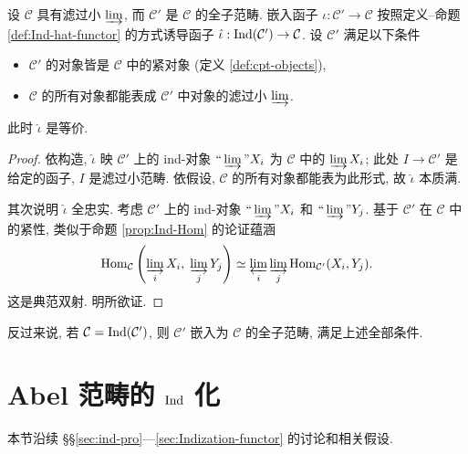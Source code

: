 \begin{proposition}[识别 $\IndC$ 化]\label{prop:recognition-Ind}
	设 $\mathcal{C}$ 具有滤过小 $\varinjlim$, 而 $\mathcal{C}'$ 是 $\mathcal{C}$ 的全子范畴. 嵌入函子 $\iota: \mathcal{C}' \to \mathcal{C}$ 按照定义--命题 \ref{def:Ind-hat-functor} 的方式诱导函子 $\hat{\iota}: \operatorname{Ind}(\mathcal{C}') \to \mathcal{C}$. 设 $\mathcal{C}'$ 满足以下条件
	\begin{itemize}
		\item $\mathcal{C}'$ 的对象皆是 $\mathcal{C}$ 中的紧对象 (定义 \ref{def:cpt-objects}),
		\item $\mathcal{C}$ 的所有对象都能表成 $\mathcal{C}'$ 中对象的滤过小 $\varinjlim$.
	\end{itemize}
	此时 $\hat{\iota}$ 是等价.
\end{proposition}
\begin{proof}
	依构造, $\hat{\iota}$ 映 $\mathcal{C}'$ 上的 ind-对象 $\Yinjlim X_i$ 为 $\mathcal{C}$ 中的 $\varinjlim X_i$; 此处 $I \to \mathcal{C}'$ 是给定的函子, $I$ 是滤过小范畴. 依假设, $\mathcal{C}$ 的所有对象都能表为此形式, 故 $\hat{\iota}$ 本质满.
	
	其次说明 $\hat{\iota}$ 全忠实. 考虑 $\mathcal{C}'$ 上的 ind-对象 $\Yinjlim X_i$ 和 $\Yinjlim Y_j$. 基于 $\mathcal{C}'$ 在 $\mathcal{C}$ 中的紧性, 类似于命题 \ref{prop:Ind-Hom} 的论证蕴涵
	\begin{gather*}
		\operatorname{Hom}_{\mathcal{C}}\left( \varinjlim_i X_i, \; \varinjlim_j Y_j\right) \simeq \varprojlim_i \varinjlim_j \operatorname{Hom}_{\mathcal{C}'}(X_i, Y_j).
	\end{gather*}
	这是典范双射. 明所欲证.
\end{proof}

反过来说, 若 $\mathcal{C} = \operatorname{Ind}(\mathcal{C}')$, 则 $\mathcal{C}'$ 嵌入为 $\mathcal{C}$ 的全子范畴, 满足上述全部条件.

\section{Abel 范畴的 \texorpdfstring{$\IndC$}{Ind} 化}\label{sec:Indization-Abel}
本节沿续 \S\S\ref{sec:ind-pro}---\ref{sec:Indization-functor} 的讨论和相关假设.

